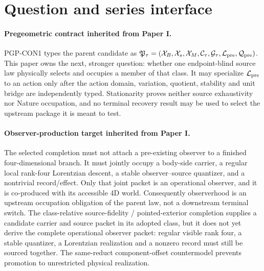 \documentclass[11pt]{article}
\begin{document}
\section{Question and series interface}

\paragraph{Pregeometric contract inherited from Paper I.}
PGP-CON1 types the parent candidate as
\(
\mathfrak P_\tau=(\mathcal X_B,\mathcal X_s,\mathcal X_M,
\mathcal C_\tau,\mathcal G_\tau,\mathcal L_{\rm pre},
\mathcal Q_{\rm pre})
\).
This paper owns the next, stronger question: whether one endpoint-blind
source law physically selects and occupies a member of that class. It may
specialize \(\mathcal L_{\rm pre}\) to an action only after the action domain,
variation, quotient, stability and unit bridge are independently typed.
Stationarity proves neither source exhaustivity nor Nature occupation, and no
terminal recovery result may be used to select the upstream package it is
meant to test.

\paragraph{Observer-production target inherited from Paper I.}
The selected completion must not attach a pre-existing observer to a finished
four-dimensional branch.  It must jointly occupy a body-side carrier, a
regular local rank-four Lorentzian descent, a stable observer--source
quantizer, and a nontrivial record/effect.  Only that joint packet is an
operational observer, and it is co-produced with its accessible 4D world.
Consequently observerhood is an upstream occupation obligation of the parent
law, not a downstream terminal switch.  The class-relative source-fidelity /
pointed-exterior completion supplies a candidate carrier and source packet in
its adopted class, but it does not yet derive the complete operational
observer packet: regular visible rank four, a stable quantizer, a Lorentzian
realization and a nonzero record must still be sourced together.  The
same-reduct component-offset countermodel prevents promotion to unrestricted
physical realization.
\end{document}
